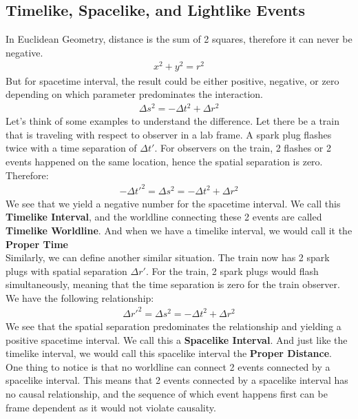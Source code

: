 \documentclass[11pt,letterpaper]{book}
\begin{document}
\subsection{Timelike, Spacelike, and Lightlike Events}
In Euclidean Geometry, distance is the sum of 2 squares, therefore it can never be negative.
\begin{align}
x^2 + y^2 = r^2
\end{align}
But for spacetime interval, the result could be either positive, negative, or zero depending on which parameter predominates the interaction.
\begin{align}
\Delta s^2 = -\Delta t^2 + \Delta r^2
\end{align}
Let's think of some examples to understand the difference. Let there be a train that is traveling with respect to observer in a lab frame. A spark plug flashes twice with a time separation of $\Delta t'$. For observers on the train, 2 flashes or 2 events happened on the same location, hence the spatial separation is zero. Therefore:
\begin{align}
-\Delta t'^2 = \Delta s^2 =  -\Delta t^2 + \Delta r^2
\end{align}
We see that we yield a negative number for the spacetime interval. We call this \textbf{Timelike Interval}, and the worldline connecting these 2 events are called \textbf{Timelike Worldline}. And when we have a timelike interval, we would call it the \textbf{Proper Time}\\

Similarly, we can define another similar situation. The train now has 2 spark plugs with spatial separation $\Delta r'$. For the train, 2 spark plugs would flash simultaneously, meaning that the time separation is zero for the train observer. We have the following relationship:
\begin{align}
\Delta r'^2 = \Delta s^2 = -\Delta t^2 + \Delta r^2
\end{align}
We see that the spatial separation predominates the relationship and yielding a positive spacetime interval. We call this a \textbf{Spacelike Interval}. And just like the timelike interval, we would call this spacelike interval the \textbf{Proper Distance}.\\

One thing to notice is that no worldline can connect 2 events connected by a spacelike interval. This means that 2 events connected by a spacelike interval has no causal relationship, and the sequence of which event happens first can be frame dependent as it would not violate causality.\\
\end{document}
